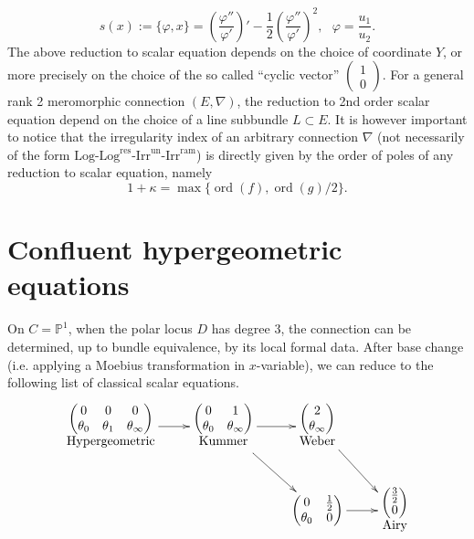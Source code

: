 \documentclass[12]{amsart}
\newcommand{\Log}{\boldsymbol{\mathrm{Log}}}
\newcommand{\Logres}{\boldsymbol{\mathrm{Log}^{\mathrm{res}}}}
\newcommand{\Irrun}{\boldsymbol{\mathrm{Irr}^{\mathrm{un}}}}
\newcommand{\Irram}{\boldsymbol{\mathrm{Irr}^{\mathrm{ram}}}}
\DeclareMathOperator{\ord}{ord}
\begin{document}
$$s(x):=\{\varphi,x\}=\left(\frac{\varphi''}{\varphi'}\right)'-\frac{1}{2}\left(\frac{\varphi''}{\varphi'}\right)^2,\ \ \ \varphi=\frac{u_1}{u_2}.$$
The above reduction to scalar equation depends on the choice of coordinate $Y$, or more precisely on the choice 
of the so called ``cyclic vector'' $\begin{pmatrix}1\\0\end{pmatrix}$. For a general rank 2 meromorphic connection $(E,\nabla)$,
the reduction to 2nd order scalar equation depend on the choice of a line subbundle $L\subset E$.
It is however important to notice that the irregularity index of an arbitrary connection $\nabla$ 
(not necessarily of the form $\Log$-$\Logres$-$\Irrun$-$\Irram$)
is directly given by the order of poles of any reduction to scalar equation, namely
$$1+\kappa=\max\{\ord(f),\ord(g)/2\}.$$

\section{Confluent hypergeometric equations}\label{sec:ConfluentHypergeometric}
On $C=\mathbb P^1$, when the polar locus $D$ has degree $3$, the connection can be determined, 
up to bundle equivalence, by its local formal data. After base change (i.e. applying
a Moebius transformation in $x$-variable), we can reduce to the following list 
of classical scalar equations.
$$
\xymatrix{
{\begin{matrix}
\begin{pmatrix}0&0&0\\ \theta_0&\theta_1&\theta_\infty\end{pmatrix}\\
\text{Hypergeometric}
\end{matrix}}
\ar[r]
&
{\begin{matrix}
\begin{pmatrix}0&1\\ \theta_0&\theta_\infty\end{pmatrix}\\
\text{Kummer}
\end{matrix}}
\ar[r]\ar[rd]
&
{\begin{matrix}
\begin{pmatrix}2\\ \theta_\infty\end{pmatrix}\\
\text{Weber}
\end{matrix}}
\ar[rd]
&\\
&&
{\begin{matrix}
\begin{pmatrix}0&\frac{1}{2}\\ \theta_0&0\end{pmatrix}
\end{matrix}}
\ar[r]
&
{\begin{matrix}
\begin{pmatrix}\frac{3}{2}\\ 0\end{pmatrix}\\
\text{Airy}
\end{matrix}}
}$$
\end{document}

